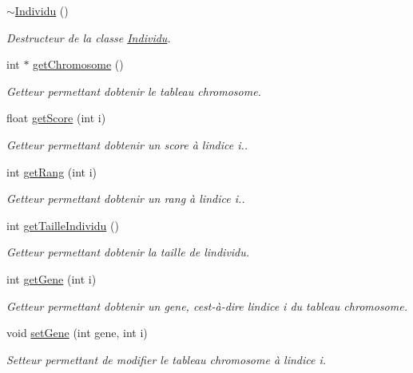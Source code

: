 \begin{DoxyCompactItemize}
\hyperlink{class_individu_a84dcf2842927993d6c9ab833dfb6997a}{$\sim$\+Individu} ()
\begin{DoxyCompactList}\small\item\em Destructeur de la classe \hyperlink{class_individu}{Individu}. \end{DoxyCompactList}\item 
int $\ast$ \hyperlink{class_individu_a2822cc97c85faa9546bd1a68e5d4c417}{get\+Chromosome} ()
\begin{DoxyCompactList}\small\item\em Getteur permettant d\textquotesingle{}obtenir le tableau chromosome. \end{DoxyCompactList}\item 
float \hyperlink{class_individu_a1da47ceca45e43d0815edb13d0ee09ee}{get\+Score} (int i)
\begin{DoxyCompactList}\small\item\em Getteur permettant d\textquotesingle{}obtenir un score à l\textquotesingle{}indice i.. \end{DoxyCompactList}\item 
int \hyperlink{class_individu_a68cbd354d58bff595f2032e813cf3af8}{get\+Rang} (int i)
\begin{DoxyCompactList}\small\item\em Getteur permettant d\textquotesingle{}obtenir un rang à l\textquotesingle{}indice i.. \end{DoxyCompactList}\item 
int \hyperlink{class_individu_ab05eebba0ec6d0e728384da2c06407c3}{get\+Taille\+Individu} ()
\begin{DoxyCompactList}\small\item\em Getteur permettant d\textquotesingle{}obtenir la taille de l\textquotesingle{}individu. \end{DoxyCompactList}\item 
int \hyperlink{class_individu_ad55048b09101f7d296c8e79c62daddac}{get\+Gene} (int i)
\begin{DoxyCompactList}\small\item\em Getteur permettant d\textquotesingle{}obtenir un gene, c\textquotesingle{}est-\/à-\/dire l\textquotesingle{}indice i du tableau chromosome. \end{DoxyCompactList}\item 
void \hyperlink{class_individu_a3b3dab8bc62e405506e9b7a7325ad410}{set\+Gene} (int gene, int i)
\begin{DoxyCompactList}\small\item\em Setteur permettant de modifier le tableau chromosome à l\textquotesingle{}indice i. \end{DoxyCompactList}\item 

\end{DoxyCompactItemize}
